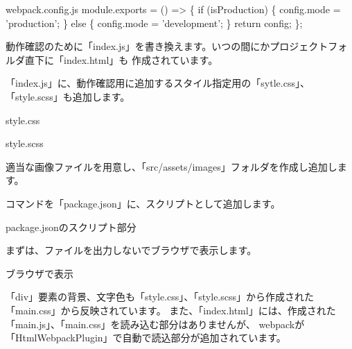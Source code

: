 \begin{starterprogram}[]{webpack.config.js}
{  module.exports = () =\textgreater{} \{
    if (isProduction) \{
      config.mode = 'production';
    \} else \{
      config.mode = 'development';
    \}
    return config;
  \};
}\end{starterprogram}

動作確認のために「index.js」を書き換えます。いつの間にかプロジェクトフォルダ直下に「index.html」も
作成されています。

\vspace*{\baselineskip}

「index.js」に、動作確認用に追加するスタイル指定用の「sytle.css」、「style.scss」も追加します。

\def\startercodeblockfontsize{}
\begin{starterprogram}[]{style.css}\end{starterprogram}
\def\startercodeblockfontsize{}
\begin{starterprogram}[]{style.scss}\end{starterprogram}
\vspace*{\baselineskip}

適当な画像ファイルを用意し、「src/assets/images」フォルダを作成し追加します。

\vspace*{\baselineskip}

コマンドを「package.json」に、スクリプトとして追加します。

\def\startercodeblockfontsize{}
\begin{starterprogram}[]{package.jsonのスクリプト部分}\end{starterprogram}

まずは、ファイルを出力しないでブラウザで表示します。

\def\startercodeblockfontsize{}
\begin{starterterminal}[]{ブラウザで表示}\end{starterterminal}

「div」要素の背景、文字色も「style.css」、「style.scss」から作成された「main.css」から反映されています。
また、「index.html」には、作成された「main.js」、「main.css」を読み込む部分はありませんが、
webpackが「HtmlWebpackPlugin」で自動で読込部分が追加されています。

